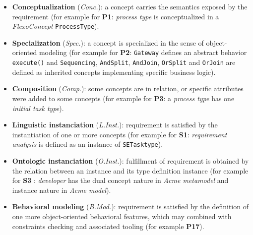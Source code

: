\begin{itemize}
    \item \textbf{Conceptualization} (\textit{Conc.}): a concept carries the semantics exposed by the requirement (for example for \textbf{P1}: \textit{process type} is conceptualized in a \textit{FlexoConcept} \texttt{ProcessType}).
    \item \textbf{Specialization} (\textit{Spec.}): a concept is specialized in the sense of object-oriented modeling (for example for \textbf{P2}: \texttt{Gateway} defines an abstract behavior \texttt{execute()} and \texttt{Sequencing}, \texttt{AndSplit}, \texttt{AndJoin}, \texttt{OrSplit} and \texttt{OrJoin} are defined as inherited concepts implementing specific business logic).
    \item \textbf{Composition} (\textit{Comp.}): some concepts are in relation, or specific attributes were added to some concepts (for example for \textbf{P3}: a \textit{process type} has one \textit{initial task type}).
    \item \textbf{Linguistic instanciation} (\textit{L.Inst.}): requirement is satisfied by the instantiation of one or more concepts (for example for \textbf{S1}: \textit{requirement analysis} is defined as an instance of \texttt{SETasktype}).
    \item \textbf{Ontologic instanciation} (\textit{O.Inst.}): fulfillment of requirement is obtained by the relation between an instance and its type definition instance (for example for \textbf{S3} : \textit{developer} has the dual concept nature in \textit{Acme metamodel} and instance nature in \textit{Acme model}).
    \item \textbf{Behavioral modeling} (\textit{B.Mod.}): requirement is satisfied by the definition of one more object-oriented behavioral features, which may combined with constraints checking and associated tooling (for example \textbf{P17}).
\end{itemize}




